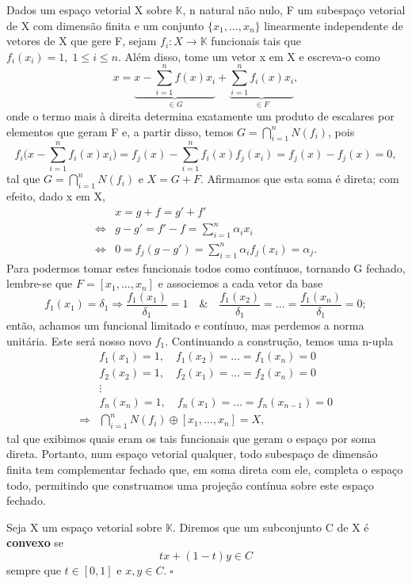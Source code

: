 \documentclass[../functional_analysis.tex]{subfiles}
\begin{document}
Dados um espaço vetorial X sobre \(\mathbb{K}\), n natural não nulo, F um subespaço vetorial de X com dimensão finita e um conjunto \(\{x_1, \dotsc , x_{n}\}\) linearmente independente de vetores de X que gere F, sejam \(f_{i}:X\rightarrow \mathbb{K}\) funcionais tais que \(f_{i}(x_{i}) = 1,\; 1\leq i\leq n\). Além disso, tome um vetor x em X e escreva-o como
\[
	x = \underbrace{x - \sum\limits_{i=1}^{n} f(x)x_{i}}_{\in G} + \underbrace{\sum\limits_{i=1}^{n}f_{i}(x)x_{i}}_{\in F},
\]
onde o termo mais à direita determina exatamente um produto de escalares por elementos que geram F e, a partir disso, temos \(G = \bigcap_{i=1}^{n}N(f_{i})\), pois
\[
	f_{i} \bigl( x-\sum\limits_{i=1}^{n}f_{i}(x)x_{i}\bigr) = f_{j}(x) - \sum\limits_{i=1}^{n}f_{i}(x)f_{j}(x_{i}) = f_{j}(x) - f_{j}(x) = 0,
\]
tal que \(G=\bigcap_{i=1}^{n}N(f_{i})\) e \(X = G+F\). Afirmamos que esta soma é direta; com efeito, dado x em X,
\begin{align*}
	                    & x = g+f = g'+f'                                                           \\
	\Longleftrightarrow & g-g' = f'-f = \sum\limits_{i=1}^{n}\alpha_{i}x_{i}                        \\
	\Longleftrightarrow & 0=f_{j}(g-g') = \sum\limits_{i=1}^{n}\alpha_{i}f_{j}(x_{i}) = \alpha_{j}.
\end{align*}
Para podermos tomar estes funcionais todos como contínuos, tornando G fechado, lembre-se que \(F = [x_1, \dotsc , x_{n}]\) e associemos a cada vetor da base
\[
	f_1(x_1) = \delta _1 \Rightarrow \frac{f_1(x_1)}{\delta_1} = 1 \quad\&\quad \frac{f_1(x_2)}{\delta_1}=\dotsc = \frac{f_{1}(x_{n})}{\delta_1} = 0;
\]
então, achamos um funcional limitado e contínuo, mas perdemos a norma unitária. Este será nosso novo \(f_1\). Continuando a construção, temos uma n-upla
\begin{align*}
	            & f_1(x_1) = 1,\quad f_1(x_2) = \dotsc = f_1(x_{n}) = 0      \\
	            & f_2(x_2) = 1,\quad f_2(x_1) = \dotsc = f_2(x_{n}) = 0      \\
	            & \vdots                                                     \\
	            & f_n(x_n) = 1,\quad f_n(x_1) = \dotsc = f_n(x_{n-1}) = 0    \\
	\Rightarrow & \bigcap_{i=1}^{n}N(f_{i})\oplus [x_1, \dotsc , x_{n}] = X,
\end{align*}
tal que exibimos quais eram os tais funcionais que geram o espaço por soma direta. Portanto, num espaço vetorial qualquer, todo subespaço de dimensão finita tem complementar fechado que, em soma direta com ele, completa o espaço todo, permitindo que construamos uma projeção contínua sobre este espaço fechado.
\begin{def*}
	Seja X um espaço vetorial sobre \(\mathbb{K}. \) Diremos que um subconjunto C de X é \textbf{convexo} se
	\[
		tx+(1-t)y\in C
	\]
	sempre que \(t\in [0,1]\) e \(x,y\in C.\; \square\)
\end{def*}
\end{document}
